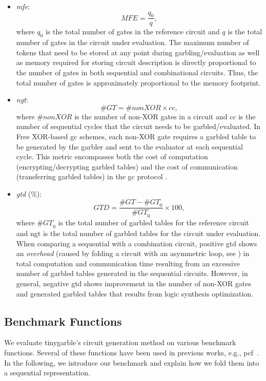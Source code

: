 \begin{itemize}
\item \textit{\acrfull{mfe}}: $$\mathit{MFE} = \dfrac{q_{0}}{q},$$ where $q_{0}$ is the total number of gates in the reference circuit and $q$ is the total number of gates in the circuit under evaluation.
		The maximum number of tokens that need to be stored at any point during garbling/evaluation as well as memory required for storing circuit description is directly proportional to the number of gates in both sequential and combinational circuits.
		Thus, the total number of gates is approximately proportional to the memory footprint.

\item \textit{\acrfull{ngt}}: $$\mathit{\#GT} = \#nonXOR\times cc,$$ where $\#nonXOR$ is the number of non-XOR gates in a circuit and $cc$ is the number of sequential cycles that the circuit needs to be garbled/evaluated.
		In Free XOR-based \acrshort{gc} schemes, each non-XOR gate requires a garbled table to be generated by the garbler and sent to the evaluator at each sequential cycle.
		This metric encompasses both the cost of computation (encrypting/decrypting garbled tables) and the cost of communication (transferring garbled tables) in the \acrshort{gc} protocol \cite{kolesnikov2008improved}.

\item \textit{\acrfull{gtd}} (\%): $$\mathit{GTD} = \dfrac{\mathit{\#GT} - \mathit{\#GT}_{0}}{\mathit{\#GT}_{0}} \times 100,$$ where $\mathit{\#GT}_{0}$ is the total number of garbled tables for the reference circuit and \acrshort{ngt} is the total number of garbled tables for the circuit under evaluation.
		When comparing a sequential with a combination circuit, positive \acrshort{gtd} shows an \emph{overhead} (caused by folding a circuit with an asymmetric loop, see ) in total computation and communication time resulting from an excessive number of garbled tables generated in the sequential circuits.
		However, in general, negative \acrshort{gtd} shows improvement in the number of non-XOR gates and generated garbled tables that results from logic synthesis optimization.
\end{itemize}

\subsection{Benchmark Functions}\label{ssec:eval-tinygarble-benchmark}
We evaluate \gls{tinygarble}'s circuit generation method on various benchmark functions.
Several of these functions have been used in previous works, e.g., \gls{pcf}~\cite{kreuter2013pcf}.
In the following, we introduce our benchmark and explain how we fold them into a sequential representation.

